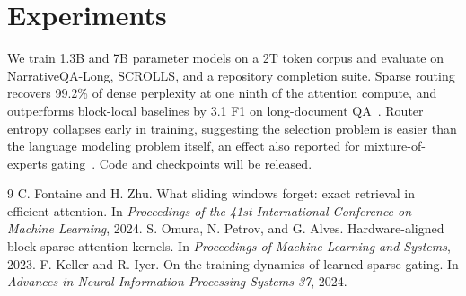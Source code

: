 \documentclass[10pt,twocolumn]{article}
\begin{document}
\section{Experiments}
We train 1.3B and 7B parameter models on a 2T token corpus and evaluate on
NarrativeQA-Long, SCROLLS, and a repository completion suite. Sparse routing
recovers 99.2\% of dense perplexity at one ninth of the attention compute,
and outperforms block-local baselines by 3.1 F1 on long-document
QA~\cite{omura2023blocksparse}. Router entropy collapses early in training,
suggesting the selection problem is easier than the language modeling problem
itself, an effect also reported for mixture-of-experts
gating~\cite{keller2024gating}. Code and checkpoints will be released.

\begin{thebibliography}{9}
 C. Fontaine and H. Zhu.
What sliding windows forget: exact retrieval in efficient attention.
In \textit{Proceedings of the 41st International Conference on Machine Learning}, 2024.
 S. Omura, N. Petrov, and G. Alves.
Hardware-aligned block-sparse attention kernels.
In \textit{Proceedings of Machine Learning and Systems}, 2023.
 F. Keller and R. Iyer.
On the training dynamics of learned sparse gating.
In \textit{Advances in Neural Information Processing Systems 37}, 2024.
\end{thebibliography}
\end{document}

